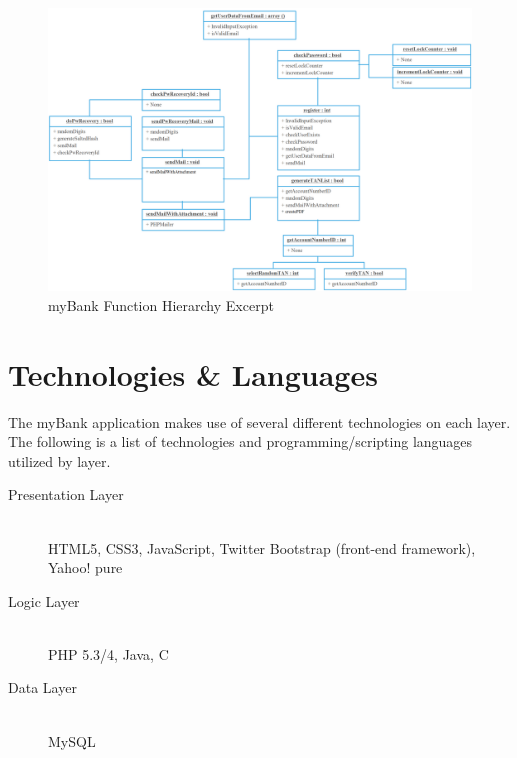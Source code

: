 \begin{center}
\begin{figure}[hbtp]
        \centering
        \includegraphics[width=1.0\linewidth]{hierarchy}
        \caption{myBank Function Hierarchy Excerpt}\label{hierarchy}
\end{figure}
\end{center}
\section{Technologies \& Languages}
The myBank application makes use of several different technologies on each layer. The following is a list of technologies and programming/scripting languages utilized by layer.
\begin{description}
  \item[Presentation Layer] \hfill \\
  HTML5, CSS3, JavaScript, Twitter Bootstrap (front-end framework), Yahoo! pure
  \item[Logic Layer] \hfill \\
  PHP 5.3/4, Java, C
  \item[Data Layer] \hfill \\
  MySQL
\end{description}